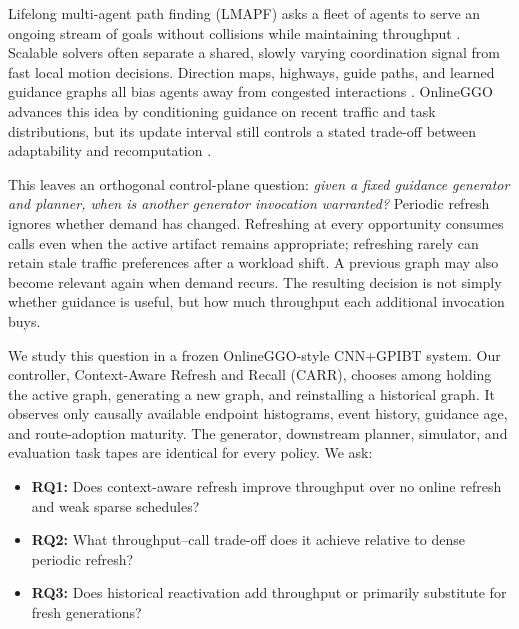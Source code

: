 \documentclass[sigconf,anonymous,review]{acmart}
\newcommand{\carr}{\textsc{CARR}}
\begin{document}
Lifelong multi-agent path finding (LMAPF) asks a fleet of agents to serve an
ongoing stream of goals without collisions while maintaining throughput
\cite{ma2017lifelong}. Scalable solvers often separate a shared, slowly varying
coordination signal from fast local motion decisions. Direction maps,
highways, guide paths, and learned guidance graphs all bias agents away from
congested interactions \cite{jansen2008direction,cohen2015highways,
chen2024traffic,ijcai2024p0035}. OnlineGGO advances this idea by conditioning
guidance on recent traffic and task distributions, but its update interval
still controls a stated trade-off between adaptability and recomputation
\cite{zang2025online}.

This leaves an orthogonal control-plane question: \emph{given a fixed guidance
generator and planner, when is another generator invocation warranted?}
Periodic refresh ignores whether demand has changed. Refreshing at every
opportunity consumes calls even when the active artifact remains appropriate;
refreshing rarely can retain stale traffic preferences after a workload
shift. A previous graph may also become relevant again when demand recurs.
The resulting decision is not simply whether guidance is useful, but how much
throughput each additional invocation buys.

We study this question in a frozen OnlineGGO-style CNN+GPIBT system. Our
controller, Context-Aware Refresh and Recall (\carr), chooses among holding the
active graph, generating a new graph, and reinstalling a historical graph.
It observes only causally available endpoint histograms, event history,
guidance age, and route-adoption maturity. The generator, downstream planner,
simulator, and evaluation task tapes are identical for every policy. We ask:

\begin{itemize}
  \item \textbf{RQ1:} Does context-aware refresh improve throughput over no
  online refresh and weak sparse schedules?
  \item \textbf{RQ2:} What throughput--call trade-off does it achieve relative
  to dense periodic refresh?
  \item \textbf{RQ3:} Does historical reactivation add throughput or primarily
  substitute for fresh generations?
\end{itemize}
\end{document}
